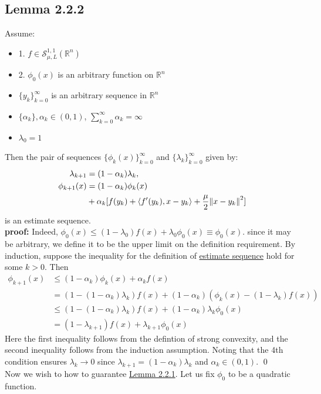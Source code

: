 \documentclass[12pt,a4paper]{article}
\begin{document}
	 \subsection*{Lemma 2.2.2}\label{lem222}
	 Assume:
	 \begin{itemize}
	 	\item 1. $f \in \mathcal{S}_{\mu, L}^{1,1}(\mathbb{R}^n)$
	 	\item 2. $\phi_0(x)$ is an arbitrary function on $\mathbb{R}^n$
	 	\item $\{y_k\}_{k=0}^{\infty}$ is an arbitrary sequence in $\mathbb{R}^n$
	 	\item $\{\alpha_k\}, \alpha_k \in (0,1)$, $\sum_{k=0}^{\infty}\alpha_k = \infty$
	 	\item $\lambda_0=1$
	 \end{itemize}
	 Then the pair of sequences $\{\phi_k(x)\}_{k=0}^{\infty}$ and $\{\lambda_k\}_{k=0}^{\infty}$ given by:
	 \begin{align*}
	 	\lambda_{k+1} &= (1 - \alpha_k)\lambda_k , \\
	 	\phi_{k+1}(x) &= (1 - \alpha_k)\phi_k(x)  \\
	 	&+ \alpha_k[f(y_k) + \langle f'(y_k), x - y_k \rangle + \frac{\mu}{2}\norm{x - y_k}^2]
	 \end{align*} 
	 is an estimate sequence.\\
	 \textbf{proof:} Indeed, $\phi_0(x)\leq (1 - \lambda_0)f(x) + \lambda_0\phi_0(x) \equiv \phi_0(x)$. since it may be arbitrary, we define it to be the upper limit on the definition requirement. By induction, suppose the inequality for the definition of \hyperref[sec:Def]{estimate sequence} hold for some $k > 0$. Then
	 \begin{align*}
	 	\phi_{k+1}(x) &\leq (1 - \alpha_k)\phi_k(x) + \alpha_kf(x) \\
	 	&= (1 - (1 - \alpha_k)\lambda_k)f(x) + (1 - \alpha_k)(\phi_k(x) - ( 1 - \lambda_k)f(x)) \\
	 	&\leq (1 - (1-\alpha_k)\lambda_k)f(x) + ( 1 - \alpha_k)\lambda_k\phi_0(x) \\
	 	&= ( 1 - \lambda_{k+1})f(x) + \lambda_{k+1}\phi_0(x)
	 \end{align*}
	 Here the first inequality follows from the defintion of strong convexity, and the second inequality follows from the induction assumption. 
	 Noting that the 4th condition ensures $\lambda_k \rightarrow 0$ since $\lambda_{k+1} = (1 - \alpha_k)\lambda_k$ and $\alpha_k \in (0,1)$. \qed \\
	 Now we wish to how to guarantee \hyperref[lem221]{Lemma 2.2.1}. Let us fix $\phi_0$ to be a quadratic function.
\end{document}
